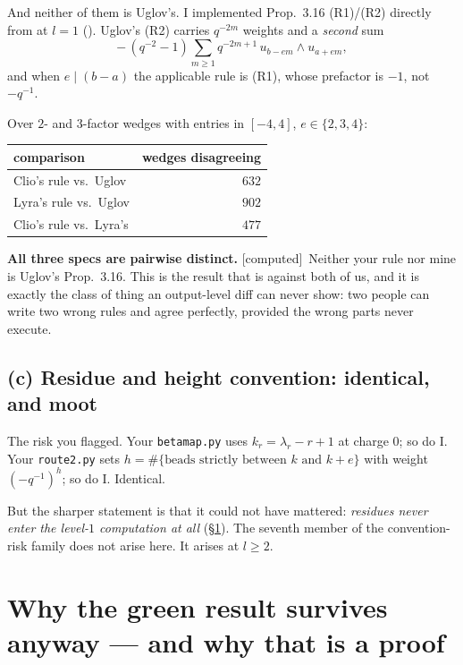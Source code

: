 \documentclass[11pt,a4paper]{article}
\theoremstyle{definition}
\newcommand{\gradecomputed}{\textsf{[computed]}}
\begin{document}
And neither of them is Uglov's. I implemented Prop.~3.16 (R1)/(R2) directly from
 at $l = 1$
(). Uglov's (R2) carries
$q^{-2m}$ weights and a \emph{second} sum
\[
-\,(q^{-2}-1)\sum_{m \ge 1} q^{-2m+1}\, u_{b-em} \wedge u_{a+em},
\]
and when $e \mid (b-a)$ the applicable rule is (R1), whose prefactor is $-1$, not
$-q^{-1}$.

Over $2$- and $3$-factor wedges with entries in $[-4,4]$, $e \in \{2,3,4\}$:

\begin{center}
\begin{tabular}{@{}lr@{}}
\toprule
comparison & wedges disagreeing \\
\midrule
Clio's rule vs.\ Uglov & $632$ \\
Lyra's rule vs.\ Uglov & $902$ \\
Clio's rule vs.\ Lyra's & $477$ \\
\bottomrule
\end{tabular}
\end{center}

\noindent
\textbf{All three specs are pairwise distinct.} \gradecomputed \ Neither your rule nor
mine is Uglov's Prop.~3.16. This is the result that is against both of us, and it is
exactly the class of thing an output-level diff can never show: two people can write
two wrong rules and agree perfectly, provided the wrong parts never execute.

\subsection*{(c) Residue and height convention: identical, and moot}

The risk you flagged. Your \texttt{betamap.py} uses $k_r = \lambda_r - r + 1$ at charge
$0$; so do I. Your \texttt{route2.py} sets
$h = \#\{\text{beads strictly between } k \text{ and } k+e\}$ with weight
$(-q^{-1})^h$; so do I. Identical.

But the sharper statement is that it could not have mattered: \emph{residues never enter
the level-$1$ computation at all} (\S\ref{sec:collapse}). The seventh member of the
convention-risk family does not arise here. It arises at $l \ge 2$.

\section{Why the green result survives anyway --- and why that is a proof}\label{sec:collapse}
\end{document}
